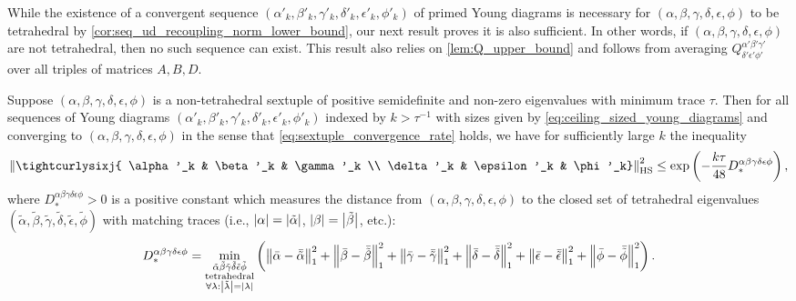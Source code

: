 \documentclass[notitlepage, 10pt]{article}
\begin{document}
While the existence of a convergent sequence $(\alpha'_k, \beta'_k, \gamma'_k, \delta'_k, \epsilon'_k, \phi'_k)$ of primed Young diagrams is necessary for $(\alpha,\beta,\gamma,\delta,\epsilon,\phi)$ to be tetrahedral by \cref{cor:seq_ud_recoupling_norm_lower_bound}, our next result proves it is also sufficient.
In other words, if $(\alpha,\beta,\gamma,\delta,\epsilon,\phi)$ are not tetrahedral, then no such sequence can exist.
This result also relies on \cref{lem:Q_upper_bound} and follows from averaging $Q^{\alpha'\beta'\gamma'}_{\delta'\epsilon'\phi'}$ over all triples of matrices $A,B,D$.

\begin{thm}
    Suppose $(\alpha, \beta, \gamma, \delta, \epsilon, \phi)$ is a non-tetrahedral sextuple of positive semidefinite and non-zero eigenvalues with minimum trace $\tau$.
    Then for all sequences of Young diagrams $(\alpha'_k, \beta'_k, \gamma'_k, \delta'_k, \epsilon'_k, \phi'_k)$ indexed by $k > \tau^{-1}$ with sizes given by \cref{eq:ceiling_sized_young_diagrams} and converging to $(\alpha,\beta,\gamma,\delta,\epsilon,\phi)$ in the sense that \cref{eq:sextuple_convergence_rate} holds, we have for sufficiently large $k$ the inequality
    \begin{equation}
        \label{eq:seq_ud_sixj_upper_bound}
        \norm{\tightcurlysixj{ \alpha'_k & \beta'_k & \gamma'_k \\ \delta'_k &  \epsilon'_k &  \phi'_k}}_{\mathrm{HS}}^{2}
        \leq \exp\left(- \frac{k \tau}{48} D_{*}^{\alpha\beta\gamma\delta\epsilon\phi}\right),
    \end{equation}
    where $D_{*}^{\alpha\beta\gamma\delta\epsilon\phi} > 0$ is a positive constant which measures the distance from $(\alpha, \beta, \gamma, \delta, \epsilon, \phi)$ to the closed set of tetrahedral eigenvalues $(\tilde \alpha, \tilde \beta, \tilde \gamma, \tilde \delta, \tilde \epsilon, \tilde \phi)$ with matching traces (i.e., $\left|\alpha\right|=\left|\tilde \alpha\right|$, $\left|\beta\right|=\left|\tilde \beta\right|$, etc.):
    \begin{equation}
        D_{*}^{\alpha\beta\gamma\delta\epsilon\phi} =
        \min_{\substack{\tilde \alpha \tilde \beta \tilde \gamma\tilde\delta \tilde \epsilon \tilde \phi\\\mathrm{tetrahedral}\\\forall \lambda : \left|\tilde \lambda\right|=\left|\lambda\right|}}
        \left( 
        \left\lVert\bar \alpha - \bar {\tilde \alpha}\right\rVert_{1}^{2} +
        \left\lVert\bar \beta - \bar {\tilde \beta}\right\rVert_{1}^{2} +
        \left\lVert\bar \gamma - \bar {\tilde \gamma}\right\rVert_{1}^{2} +
        \left\lVert\bar \delta - \bar {\tilde \delta}\right\rVert_{1}^{2} +
        \left\lVert\bar \epsilon - \bar {\tilde \epsilon}\right\rVert_{1}^{2} +
        \left\lVert\bar \phi - \bar {\tilde \phi}\right\rVert_{1}^{2}
        \right)
        .
    \end{equation}
\end{thm}
\end{document}

